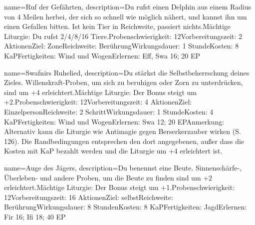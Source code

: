 {
    name={Ruf der Gefährten},
    description={Du rufst einen Delphin aus einem Radius von 4 Meilen herbei, der sich so schnell wie möglich nähert, und kannst ihn um einen Gefallen bitten. Ist kein Tier in Reichweite, passiert nichts.\newline Mächtige Liturgie: Du rufst 2/4/8/16 Tiere.\newline Probenschwierigkeit: 12\newline Vorbereitungszeit: 2 Aktionen\newline Ziel: Zone\newline Reichweite: Berührung\newline Wirkungsdauer: 1 Stunde\newline Kosten: 8 KaP\newline Fertigkeiten: Wind und Wogen\newline Erlernen: Eff, Swa 16; 20 EP}
}


{
    name={Swafnirs Ruhelied},
    description={Du stärkst die Selbstbeherrschung deines Zieles. Willenskraft-Proben, um sich zu beruhigen oder Zorn zu unterdrücken, sind um +4 erleichtert.\newline Mächtige Liturgie: Der Bonus steigt um +2.\newline Probenschwierigkeit: 12\newline Vorbereitungszeit: 4 Aktionen\newline Ziel: Einzelperson\newline Reichweite: 2 Schritt\newline Wirkungsdauer: 1 Stunde\newline Kosten: 4 KaP\newline Fertigkeiten: Wind und Wogen\newline Erlernen: Swa 12; 20 EP\newline Anmerkung: Alternativ kann die Liturgie wie Antimagie gegen Berserkerzauber wirken (S. 126). Die Randbedingungen entsprechen den dort angegebenen, außer dass die Kosten mit KaP bezahlt werden und die Liturgie um +4 erleichtert ist.}
}


{
    name={Auge des Jägers},
    description={Du benennst eine Beute. Sinnenschärfe-, Überleben- und andere Proben, um die Beute zu finden sind um +2 erleichtert.\newline Mächtige Liturgie: Der Bonus steigt um +1.\newline Probenschwierigkeit: 12\newline Vorbereitungszeit: 16 Aktionen\newline Ziel: selbst\newline Reichweite: Berührung\newline Wirkungsdauer: 8 Stunden\newline Kosten: 8 KaP\newline Fertigkeiten: Jagd\newline Erlernen: Fir 16; Ifi 18; 40 EP}
}



